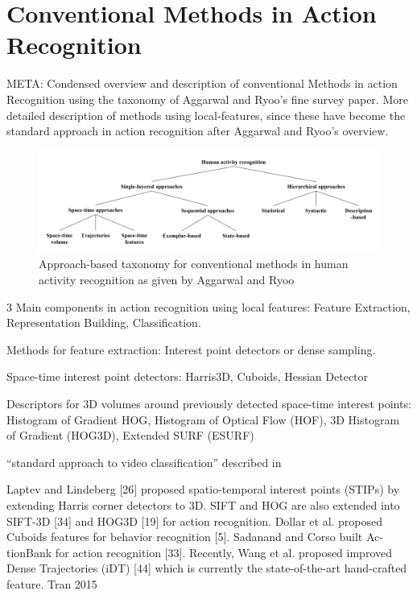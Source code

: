 \section{Conventional Methods in Action Recognition}
META: 
Condensed overview and description of conventional Methods in action Recognition using the taxonomy of Aggarwal and Ryoo's fine survey paper.
More detailed description of methods using local-features, since these have become the standard approach in action recognition after Aggarwal and Ryoo's overview.

\begin{figure}[H]
    \centering
    \includegraphics[width=\textwidth]{img_conventional/taxonomy_conventional_methods.png}
    \caption{Approach-based taxonomy for conventional methods in human activity recognition as given by Aggarwal and Ryoo\cite{aggarwal_human_2011}}
    \label{fig:conventional_taxonomy}
\end{figure}

3 Main components in action recognition using local features: Feature Extraction, Representation Building, Classification.

Methods for feature extraction: Interest point detectors or dense sampling.

Space-time interest point detectors: Harris3D\cite{laptev_space-time_2005}, Cuboids\cite{dollar_behavior_2005}, Hessian Detector\cite{willems_efficient_2008}

Descriptors for 3D volumes around previously detected space-time interest points: Histogram of Gradient HOG\cite{dalal_histograms_2005-1}, Histogram of Optical Flow (HOF)\cite{laptev_learning_2008}, 3D Histogram of Gradient (HOG3D)\cite{klaser_spatio-temporal_2008}, Extended SURF (ESURF)\cite{willems_efficient_2008}

``standard approach to video classification'' described in \cite{karpathy_large-scale_2014}

Laptev and Lindeberg [26] proposed spatio-temporal interest points (STIPs)
by extending Harris corner detectors to 3D. SIFT and HOG
are also extended into SIFT-3D [34] and HOG3D [19] for
action recognition. Dollar et al. proposed Cuboids features
for behavior recognition [5]. Sadanand and Corso built Ac-
tionBank for action recognition [33]. Recently, Wang et al.
proposed improved Dense Trajectories (iDT) [44] which is
currently the state-of-the-art hand-crafted feature. Tran 2015

